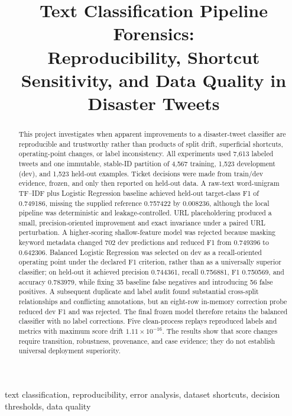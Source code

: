\documentclass[conference]{IEEEtran}
\begin{document}
\title{Text Classification Pipeline Forensics:\\
Reproducibility, Shortcut Sensitivity, and Data Quality in Disaster Tweets}

\author{
\and
{}}

\maketitle

\begin{abstract}
This project investigates when apparent improvements to a disaster-tweet classifier are reproducible and trustworthy rather than products of split drift, superficial shortcuts, operating-point changes, or label inconsistency. All experiments used 7,613 labeled tweets and one immutable, stable-ID partition of 4,567 training, 1,523 development (dev), and 1,523 held-out examples. Ticket decisions were made from train/dev evidence, frozen, and only then reported on held-out data. A raw-text word-unigram TF--IDF plus Logistic Regression baseline achieved held-out target-class F1 of 0.749186, missing the supplied reference 0.757422 by 0.008236, although the local pipeline was deterministic and leakage-controlled. URL placeholdering produced a small, precision-oriented improvement and exact invariance under a paired URL perturbation. A higher-scoring shallow-feature model was rejected because masking keyword metadata changed 702 dev predictions and reduced F1 from 0.749396 to 0.642306. Balanced Logistic Regression was selected on dev as a recall-oriented operating point under the declared F1 criterion, rather than as a universally superior classifier; on held-out it achieved precision 0.744361, recall 0.756881, F1 0.750569, and accuracy 0.783979, while fixing 35 baseline false negatives and introducing 56 false positives. A subsequent duplicate and label audit found substantial cross-split relationships and conflicting annotations, but an eight-row in-memory correction probe reduced dev F1 and was rejected. The final frozen model therefore retains the balanced classifier with no label corrections. Five clean-process replays reproduced labels and metrics with maximum score drift $1.11\times10^{-16}$. The results show that score changes require transition, robustness, provenance, and case evidence; they do not establish universal deployment superiority.
\end{abstract}

\begin{IEEEkeywords}
text classification, reproducibility, error analysis, dataset shortcuts, decision thresholds, data quality
\end{IEEEkeywords}
\end{document}
